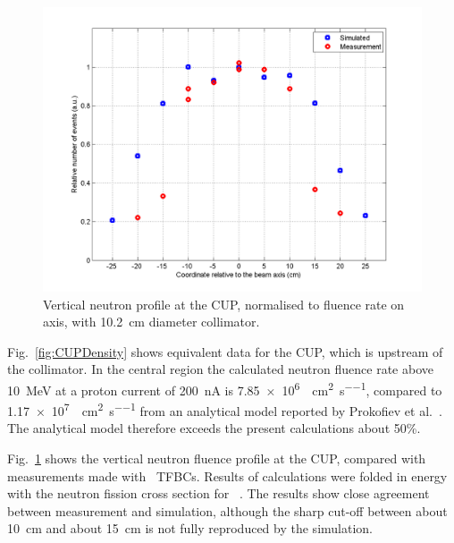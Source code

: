 \documentclass[peerreviewca,11pt,a4paper]{IEEEtran}
\let\MYoriglatexcaption\caption
\renewcommand{\caption}[2][\relax]{\MYoriglatexcaption[#2]{#2}}
\def\U238{\BPChem{\^{238}U}}
\begin{document}
\begin{figure}[!t]
    \centering
    \includegraphics[width=0.9\columnwidth]{CUPTOF10beamproRADECS.png}
    \caption{
        Vertical neutron profile at the CUP, normalised to fluence rate on axis, with
        \SI{10.2}{\cm} diameter collimator.
    }
    \label{fig:CUPProfile}
\end{figure}

Fig.~\ref{fig:CUPDensity} shows equivalent data for the CUP, which is upstream of the collimator.
In the central region the calculated neutron fluence rate above \SI{10}{\MeV} at a proton current of \SI{200}{\nA} is \SI{7.85e6}{\neutron\per\cm\squared\per\second}, compared to \SI{1.17e7}{\neutron\per\cm\squared\per\second} from an analytical model reported by Prokofiev et al.~\cite{Prokofiev2014}.
The analytical model therefore exceeds the present calculations about 50\%.

Fig.~\ref{fig:CUPProfile} shows the vertical neutron fluence profile at the CUP, compared with measurements made with \U238\ TFBCs.
Results of calculations were folded in energy with the neutron fission cross section for \U238~\cite{Carlson2009}.
The results show close agreement between measurement and simulation, although the sharp cut-off between about \SI{10}{\cm} and about \SI{15}{\cm} is not fully reproduced by the simulation.%
\end{document}

